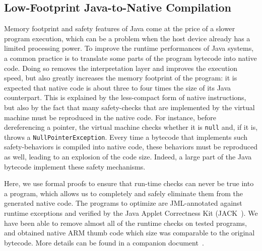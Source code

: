 \subsection{Low-Footprint Java-to-Native Compilation}
Memory footprint and safety features of Java come at the price of a slower program execution, which can be a problem when the host device already has a limited processing power. To improve the runtime performances of Java systems, a common practice is to translate some parts of the program bytecode into native code.
Doing so removes the interpretation layer and improves the execution speed, but also greatly increases the memory footprint of the program: it is expected that native code is about three to four times the size of its Java counterpart. This is explained by the less-compact form of native instructions, but also by the fact that many safety-checks that are implemented by the virtual machine must be reproduced in the native code. For instance, before dereferencing a pointer, the virtual machine checks whether it is \texttt{null} and, if it is, throws a \texttt{NullPointerException}. Every time a bytecode that implements such safety-behaviors is compiled into native code, these behaviors must be reproduced as well, leading to an explosion of the code size. Indeed, a large part of the Java bytecode implement these safety mechanisms.


Here, we use formal proofs to ensure that run-time checks can never be true into a program, which allows us to completely and safely eliminate them from the generated native code. The programs to optimize are JML-annotated against runtime exceptions and verified by the Java Applet Correctness Kit (JACK~\cite{BRL-JACK}). We have been able to remove almost all of the runtime checks on tested programs, and obtained native ARM thumb code which size was comparable to the original bytecode. 
More details can be found in a companion document~\cite{mariela06:cardis}.


